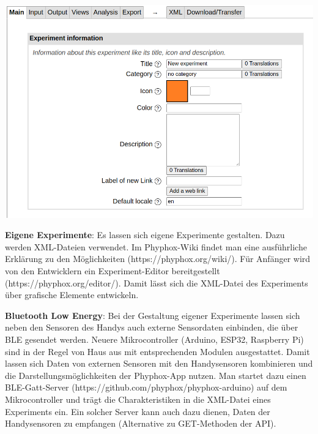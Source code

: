 \documentclass[../main.tex]{subfiles}
\begin{document}
\begin{tcolorbox}
    \vspace{0.5cm}
    \begin{minipage}[]{0.45\textwidth} 
        \includegraphics[width=\textwidth]{img/editor}
    \end{minipage}
    \hspace{0.2cm}
    \begin{minipage}[]{0.5\textwidth} 
    \textbf{Eigene Experimente}: Es lassen sich eigene Experimente gestalten. Dazu werden XML-Dateien verwendet. Im Phyphox-Wiki findet man eine ausführliche Erklärung zu den Möglichkeiten (https://phyphox.org/wiki/). Für Anfänger wird von den Entwicklern ein Experiment-Editor bereitgestellt (https://phyphox.org/editor/). Damit lässt sich die XML-Datei des Experiments über grafische Elemente entwickeln. 
    \end{minipage}
    
    \vspace{0.5cm}
    \textbf{Bluetooth Low Energy}: Bei der Gestaltung eigener Experimente lassen sich neben den Sensoren des Handys auch externe Sensordaten einbinden, die über BLE gesendet werden. Neuere Mikrocontroller (Arduino, ESP32, Raspberry Pi) sind in der Regel von Haus aus mit entsprechenden Modulen ausgestattet. Damit lassen sich Daten von externen Sensoren mit den Handysensoren kombinieren und die Darstellungsmöglichkeiten der Phyphox-App nutzen. Man startet dazu einen BLE-Gatt-Server (https://github.com/phyphox/phyphox-arduino) auf dem Mikrocontroller und trägt die Charakteristiken in die XML-Datei eines Experiments ein. Ein solcher Server kann auch dazu dienen, Daten der Handysensoren zu empfangen (Alternative zu GET-Methoden der API).    
\end{tcolorbox}
\end{document}
